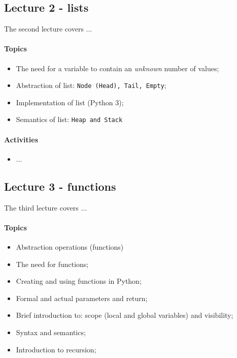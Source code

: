 			\subsection{Lecture 2 - lists}
				The second lecture covers ...

				\paragraph*{Topics}
					\begin{itemize}
						\item The need for a variable to contain an \textit{unknown} number of values;
						\item Abstraction of list: \texttt{Node (Head), Tail, Empty};
						\item Implementation of list (Python 3);
						\item Semantics of list: \texttt{Heap and Stack}
					\end{itemize}

				\paragraph*{Activities}
					\begin{itemize}
						\item ...
					\end{itemize}


			\subsection{Lecture 3 - functions}
				The third lecture covers ...

				\paragraph*{Topics}
					\begin{itemize}
						\item Abstraction operations (functions)
						\item The need for functions;
						\item Creating and using functions in Python;
						\item Formal and actual parameters and return;
						\item Brief introduction to: scope (local and global variables) and visibility;
						\item Syntax and semantics;
						\item Introduction to recursion;
					\end{itemize}

